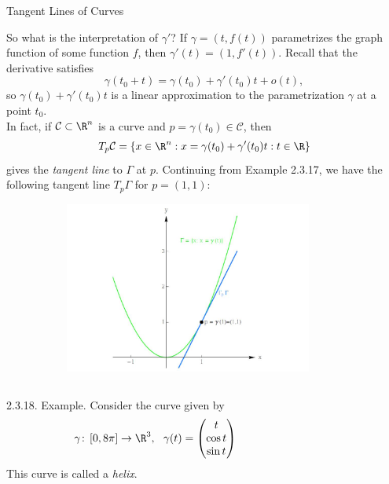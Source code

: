 \documentclass[smaller,hyperref={CJKbookmarks=true}]{beamer}
\begin{document}
\begin{frame}{Tangent Lines of Curves}
\begin{spacing}{1}
So what is the interpretation of $\gamma'$? If $\gamma=(t,f(t))$ parametrizes the graph function of some function $f$, then $\gamma'(t)=(1,f'(t))$. Recall that the derivative satisfies
\[\gamma(t_0+t)=\gamma(t_0)+\gamma'(t_0)t+o(t),\]
so $\gamma(t_0)+\gamma'(t_0)t$ is a linear approximation to the parametrization $\gamma$ at a point $t_0$.\\[5pt]
In fact, if $\mathcal{C}\subset\R^n$ is a curve and $p=\gamma(t_0)\in\mathcal{C}$, then
\[T_p\mathcal{C}=\{x\in\R^n:x=\gamma(t_0)
+\gamma'(t_0)t:t\in\R\}\]
gives the \emph{tangent line} to $\Gamma$ at $p$.
\newpage
Continuing from Example 2.3.17, we have the following tangent line $T_p\Gamma$ for $p=(1,1)$:
\begin{figure}
  \centering
  \includegraphics[width=0.9\textwidth,height=160pt]{47.jpg}
\end{figure}
\newpage
\begin{columns}[c,onlytextwidth]
\begin{column}{0.5\textwidth}
\alert{2.3.18. Example.} Consider the curve given by
\[\gamma\!:\,[0,8\pi]\to\R^3,~~\gamma(t)=\begin{pmatrix}
                                           t \\
                                           \cos t \\
                                           \sin t
                                         \end{pmatrix}\]
This curve is called a \emph{helix}.
\end{column}
\begin{column}{0.5\textwidth}

\end{column}
\end{columns}
\end{spacing}
\end{frame}
\end{document}
